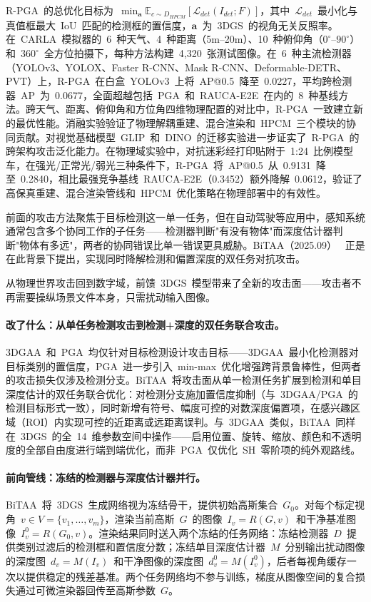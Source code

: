 R-PGA~的总优化目标为~$\min_{\mathbf{a}} \mathbb{E}_{c \sim D_{HPCM}}[\mathcal{L}_{det}(I_{det}; F)]$，其中~$\mathcal{L}_{det}$~最小化与真值框最大~IoU~匹配的检测框的置信度，$\mathbf{a}$~为~3DGS~的视角无关反照率。在~CARLA~模拟器的~6~种天气、4~种距离（5m--20m）、10~种俯仰角（$0^\circ$--$90^\circ$）和~$360^\circ$~全方位拍摄下，每种方法构建~4,320~张测试图像。在~6~种主流检测器（YOLOv3、YOLOX、Faster R-CNN、Mask R-CNN、Deformable-DETR、PVT）上，R-PGA~在白盒~YOLOv3~上将~AP@0.5~降至~0.0227，平均跨检测器~AP~为~0.0677，全面超越包括~PGA~和~RAUCA-E2E~在内的~8~种基线方法。跨天气、距离、俯仰角和方位角四维物理配置的对比中，R-PGA~一致建立新的最优性能。消融实验验证了物理解耦重建、混合渲染和~HPCM~三个模块的协同贡献。对视觉基础模型~GLIP~和~DINO~的迁移实验进一步证实了~R-PGA~的跨架构攻击泛化能力。在物理域实验中，对抗迷彩经打印贴附于~1:24~比例模型车，在强光/正常光/弱光三种条件下，R-PGA~将~AP@0.5~从~0.9131~降至~0.2840，相比最强竞争基线~RAUCA-E2E（0.3452）额外降解~0.0612，验证了高保真重建、混合渲染管线和~HPCM~优化策略在物理部署中的有效性。

前面的攻击方法聚焦于目标检测这一单一任务，但在自动驾驶等应用中，感知系统通常包含多个协同工作的子任务——检测器判断"有没有物体"而深度估计器判断"物体有多远"，两者的协同错误比单一错误更具威胁。BiTAA（2025.09）~\cite{2509_19793} 正是在此背景下提出，实现同时降解检测和偏置深度的双任务对抗攻击。

从物理世界攻击回到数字域，前馈~3DGS~模型带来了全新的攻击面——攻击者不再需要操纵场景文件本身，只需扰动输入图像。

\paragraph{改了什么：从单任务检测攻击到检测+深度的双任务联合攻击。}
3DGAA~和~PGA~均仅针对目标检测设计攻击目标——3DGAA~最小化检测器对目标类别的置信度，PGA~进一步引入~min-max~优化增强跨背景鲁棒性，但两者的攻击损失仅涉及检测分支。BiTAA~将攻击面从单一检测任务扩展到检测和单目深度估计的双任务联合优化：对检测分支施加置信度抑制（与~3DGAA/PGA~的检测目标形式一致），同时新增有符号、幅度可控的对数深度偏置项，在感兴趣区域（ROI）内实现可控的近距离或远距离误判。与~3DGAA~类似，BiTAA~同样在~3DGS~的全~14~维参数空间中操作——启用位置、旋转、缩放、颜色和不透明度的全部自由度进行端到端优化，而非~PGA~仅优化~SH~零阶项的纯外观路线。

\paragraph{前向管线：冻结的检测器与深度估计器并行。}
BiTAA~将~3DGS~生成网络视为冻结骨干，提供初始高斯集合~$G_0$。对每个标定视角~$v \in V = \{v_1, \ldots, v_m\}$，渲染当前高斯~$G$~的图像~$I_v = R(G, v)$~和干净基准图像~$I_v^0 = R(G_0, v)$。渲染结果同时送入两个冻结的任务网络：冻结检测器~$D$~提供类别过滤后的检测框和置信度分数；冻结单目深度估计器~$M$~分别输出扰动图像的深度图~$d_v = M(I_v)$~和干净图像的深度图~$d_v^0 = M(I_v^0)$，后者每视角缓存一次以提供稳定的残差基准。两个任务网络均不参与训练，梯度从图像空间的复合损失通过可微渲染器回传至高斯参数~$G$。

